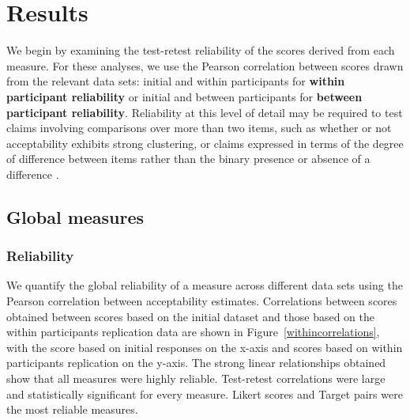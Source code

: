 \documentclass[doc]{apa6}
\newcommand{\targchoice}{{\sc Target pairs}}
\newcommand{\likert}{{\sc Likert}}
\newcommand{\initial}{{\sc initial}}
\newcommand{\withinppnt}{{\sc within participants}}
\newcommand{\betweenppnt}{{\sc between participants}}
\begin{document}
\section{Results}

We begin by examining the test-retest reliability of the scores derived from each measure. For these analyses, we use the Pearson correlation between scores drawn from the relevant data sets: \initial{} and \withinppnt{} for {\bf within participant reliability} or \initial{} and \betweenppnt{} for {\bf between participant reliability}.
Reliability at this level of detail may be required to test claims involving comparisons over more than two items, such as whether or not acceptability exhibits strong clustering, or claims expressed in terms of the degree of difference between items rather than the binary presence or absence of a difference \citep{gibson2013quantmethodsResponse,sorace2005gradience}.

\subsection{Global measures}

\subsubsection{Reliability}
We quantify the global reliability of a measure across different data sets using the Pearson correlation between acceptability estimates.
Correlations between scores obtained between scores based on the \initial{} dataset and those based on the \withinppnt{} replication data are shown in Figure~\ref{withincorrelations}, with the score based on \initial{} responses on the x-axis and scores based on \withinppnt{} replication on the y-axis. The strong linear relationships obtained show that all measures were highly reliable. Test-retest correlations were large and statistically significant for every measure. \likert{} scores and \targchoice{} were the most reliable measures.
\end{document}
